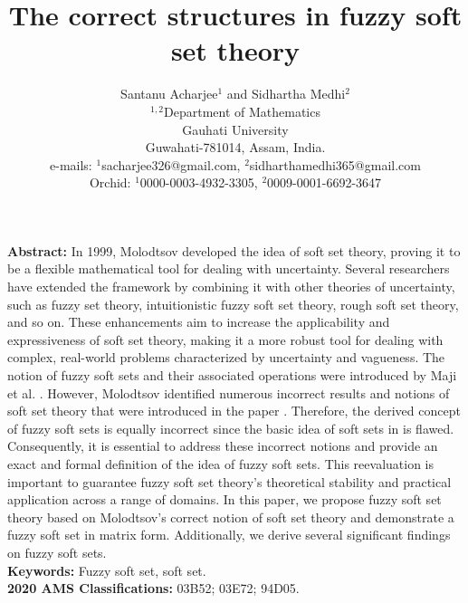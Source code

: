 \documentclass{article}
\title{The correct structures in fuzzy soft set theory}
\date{}
\theoremstyle{definition}
\begin{document}
\author{Santanu Acharjee$^1$ and Sidhartha Medhi$^2$\\
$^{1,2}$Department of Mathematics\\
Gauhati University\\
Guwahati-781014, Assam, India.\\
e-mails: $^1$sacharjee326@gmail.com,
$^2$sidharthamedhi365@gmail.com\\
Orchid: $^1$0000-0003-4932-3305,
$^2$0009-0001-6692-3647}

\maketitle
{\bf Abstract:} In 1999, Molodtsov \cite{1} developed the idea of soft set theory, proving it to be a flexible mathematical tool for dealing with uncertainty. Several researchers have extended the framework by combining it with other theories of uncertainty, such as fuzzy set theory, intuitionistic fuzzy soft set theory, rough soft set theory, and so on. These enhancements aim to increase the applicability and expressiveness of soft set theory, making it a more robust tool for dealing with complex, real-world problems characterized by uncertainty and vagueness.
The notion of fuzzy soft sets and their associated operations were introduced by Maji et al. \cite{7}. However, Molodtsov \cite{3} identified numerous incorrect results and notions of soft set theory that were introduced in the paper \cite{7}. Therefore, the derived concept of fuzzy soft sets is equally incorrect since the basic idea of soft sets in \cite{7} is flawed. Consequently, it is essential to address these incorrect notions and provide an exact and formal definition of the idea of fuzzy soft sets. This reevaluation is important to guarantee fuzzy soft set theory's theoretical stability and practical application across a range of domains. In this paper, we propose fuzzy soft set theory based on Molodtsov's correct notion of soft set theory and demonstrate a fuzzy soft set in matrix form. Additionally, we derive several significant findings on fuzzy soft sets.\\


{\bf Keywords: } Fuzzy soft set, soft set.\\

{\bf 2020 AMS Classifications: } 03B52; 03E72;  94D05.\\
\end{document}
